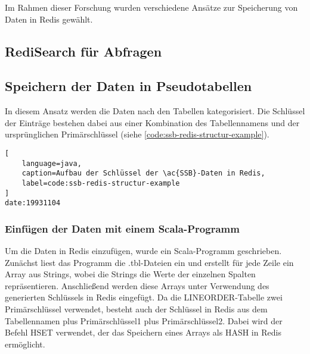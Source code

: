 Im Rahmen dieser Forschung wurden verschiedene Ansätze zur Speicherung von Daten in Redis gewählt.
\subsection{RediSearch für Abfragen}


\subsection{Speichern der Daten in Pseudotabellen}
In diesem Ansatz werden die Daten nach den Tabellen kategorisiert.
Die Schlüssel der Einträge bestehen dabei aus einer Kombination des Tabellennamens und der ursprünglichen Primärschlüssel (siehe \cref{code:ssb-redis-structur-example}).

\begin{lstlisting}[
    language=java,
    caption=Aufbau der Schlüssel der \ac{SSB}-Daten in Redis,
    label=code:ssb-redis-structur-example
]
date:19931104
\end{lstlisting}

\subsubsection{Einfügen der Daten mit einem Scala-Programm}
Um die Daten in Redis einzufügen, wurde ein Scala-Programm geschrieben.
Zunächst liest das Programm die .tbl-Dateien ein und erstellt für jede Zeile ein Array aus Strings, wobei die Strings die Werte der einzelnen Spalten repräsentieren.
Anschließend werden diese Arrays unter Verwendung des generierten Schlüssels in Redis eingefügt.
Da die LINEORDER-Tabelle zwei Primärschlüssel verwendet, besteht auch der Schlüssel in Redis aus dem Tabellennamen plus Primärschlüssel1 plus Primärschlüssel2.
Dabei wird der Befehl HSET verwendet, der das Speichern eines Arrays als HASH in Redis ermöglicht.

